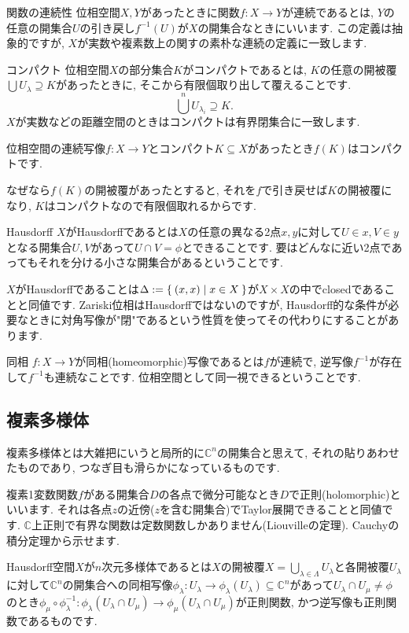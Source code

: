 \documentclass{jsarticle}
\newcommand{\CC}{\mathbb{C}}
\theoremstyle{definition}
\newcommand{\mydescription}[1]{
\begin{description}
\setlength{\itemindent}{2zw}
\setlength{\leftskip}{-2zw}
\setlength{\labelsep}{1zw}
#1
\end{description}
}
\numberwithin{theorem}{section}
\begin{document}
\mydescription{
\item[関数の連続性] 位相空間$X, Y$があったときに関数$f: X \rightarrow Y$が連続であるとは, $Y$の任意の開集合$U$の引き戻し$f^{-1}(U)$が$X$の開集合なときにいいます.
この定義は抽象的ですが, $X$が実数や複素数上の関すの素朴な連続の定義に一致します.

\item[コンパクト] 位相空間$X$の部分集合$K$がコンパクトであるとは, $K$の任意の開被覆$\bigcup U_\lambda \supseteq K$があったときに, そこから有限個取り出して覆えることです.
\[
\bigcup^n U_{\lambda_i} \supseteq K.
\]
$X$が実数などの距離空間のときはコンパクトは有界閉集合に一致します.

位相空間の連続写像$f: X \rightarrow Y$とコンパクト$K\subseteq X$があったとき$f(K)$はコンパクトです.

なぜなら$f(K)$の開被覆があったとすると, それを$f$で引き戻せば$K$の開被覆になり, $K$はコンパクトなので有限個取れるからです.

\item[Hausdorff] $X$がHausdorffであるとは$X$の任意の異なる2点$x, y$に対して$U \in x, V \in y$となる開集合$U, V$があって$U \cap V = \phi$とできることです. 要はどんなに近い2点であってもそれを分ける小さな開集合があるということです.

$X$がHausdorffであることは$\Delta := \Set{(x, x) | x \in X}$が$X \times X$の中でclosedであることと同値です. Zariski位相はHausdorffではないのですが, Hausdorff的な条件が必要なときに対角写像が"閉"であるという性質を使ってその代わりにすることがあります.

\item[同相] $f: X \rightarrow Y$が同相(homeomorphic)写像であるとは$f$が連続で, 逆写像$f^{-1}$が存在して$f^{-1}$も連続なことです. 位相空間として同一視できるということです.
}

\subsection{複素多様体}
複素多様体とは大雑把にいうと局所的に$\CC^n$の開集合と思えて, それの貼りあわせたものであり, つなぎ目も滑らかになっているものです.

複素1変数関数$f$がある開集合$D$の各点で微分可能なとき$D$で正則(holomorphic)といいます. それは各点$z$の近傍($z$を含む開集合)でTaylor展開できることと同値です. $\CC$上正則で有界な関数は定数関数しかありません(Liouvilleの定理). Cauchyの積分定理から示せます.

 Hausdorff空間$X$が$n$次元多様体であるとは$X$の開被覆$X = \bigcup_{\lambda \in \Lambda} U_\lambda$と各開被覆$U_\lambda$に対して$\CC^n$の開集合への同相写像$\phi_\lambda : U_\lambda \rightarrow \phi_\lambda(U_\lambda) \subseteq \CC^n$があって$U_\lambda \cap U_\mu \neq \phi$のとき$\phi_\mu\circ\phi_\lambda^{-1} : \phi_\lambda(U_\lambda\cap U_\mu) \rightarrow \phi_\mu(U_\lambda\cap U_\mu)$が正則関数, かつ逆写像も正則関数であるものです. 
\end{document}
